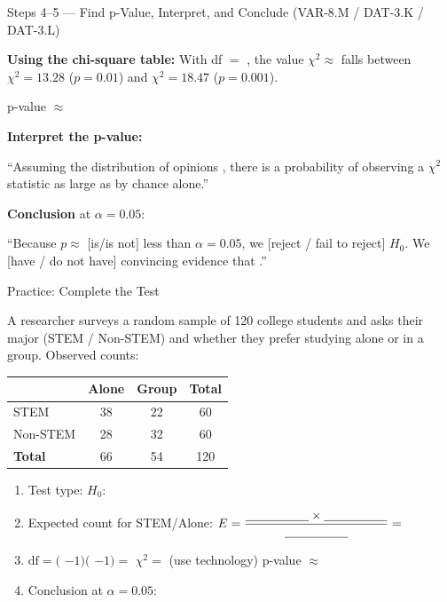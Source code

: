 \documentclass[10pt]{article}
\begin{document}
\begin{notesbox}{Steps 4--5 --- Find p-Value, Interpret, and Conclude (VAR-8.M / DAT-3.K / DAT-3.L)}

\textbf{Using the chi-square table:} With df $= $ \blank{1.5cm}, the value $\chi^2 \approx$ \blank{2cm}
falls between $\chi^2 = 13.28$ ($p = 0.01$) and $\chi^2 = 18.47$ ($p = 0.001$).

p-value $\approx$ \blank{2.5cm}

\medskip
\textbf{Interpret the p-value:}

``Assuming the distribution of opinions \blank{6cm}, there is a
\blank{2cm} probability of observing a $\chi^2$ statistic as large as \blank{2cm} by chance alone.''

\medskip
\textbf{Conclusion} at $\alpha = 0.05$:

``Because $p \approx$ \blank{2cm} [is/is not] less than $\alpha = 0.05$, we
[reject / fail to reject] $H_0$.  We [have / do not have] convincing evidence that \blank{5cm}.''

\end{notesbox}

\begin{practicebox}{Practice: Complete the Test}

A researcher surveys a random sample of 120 college students and asks their major
(STEM / Non-STEM) and whether they prefer studying alone or in a group.
Observed counts:

\renewcommand{\arraystretch}{1.3}
\begin{center}
\begin{tabular}{@{} l c c c @{}}
\hline
            & \textbf{Alone} & \textbf{Group} & \textbf{Total} \\
\hline
STEM        & 38 & 22 & 60 \\
Non-STEM    & 28 & 32 & 60 \\
\hline
\textbf{Total} & 66 & 54 & 120 \\
\hline
\end{tabular}
\end{center}

\begin{enumerate}[label=\alph*.]
  \item Test type: \blank{4cm} \quad $H_0$: \writeline
  \item Expected count for STEM/Alone: $E = \dfrac{\blank{1.8cm} \times \blank{1.8cm}}{\blank{1.8cm}} = $ \blank{2cm}
  \item $\text{df} = ($ \blank{1.5cm} $-1)($ \blank{1.5cm} $-1) = $ \blank{1.5cm}
        \quad $\chi^2 = $ \blank{2.5cm} (use technology) \quad p-value $\approx$ \blank{2.5cm}
  \item Conclusion at $\alpha = 0.05$: 
\end{enumerate}
\end{practicebox}
\end{document}
